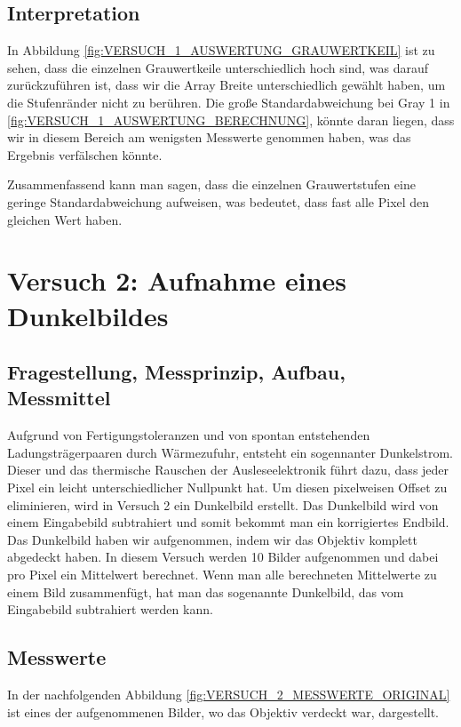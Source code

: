 \documentclass[12pt, oneside, a4paper, \docLanguage]{report}
\begin{document}
\section{Interpretation}
\label{chap:VERSUCH_1_INTERPRETATION}
In Abbildung \ref{fig:VERSUCH_1_AUSWERTUNG_GRAUWERTKEIL} ist zu sehen, dass die einzelnen Grauwertkeile unterschiedlich hoch sind, was darauf zurückzuführen ist, dass wir die Array Breite unterschiedlich gewählt haben, um die Stufenränder nicht zu berühren. Die große Standardabweichung bei Gray 1 in \ref{fig:VERSUCH_1_AUSWERTUNG_BERECHNUNG}, könnte daran liegen, dass wir in diesem Bereich am wenigsten Messwerte genommen haben, was das Ergebnis verfälschen könnte.

Zusammenfassend kann man sagen, dass die einzelnen Grauwertstufen eine geringe Standardabweichung aufweisen, was bedeutet, dass fast alle Pixel den gleichen Wert haben.


%
%
\chapter{Versuch 2: Aufnahme eines Dunkelbildes}
\label{chap:VERSUCH_2}

\section{Fragestellung, Messprinzip, Aufbau, Messmittel}
\label{chap:VERSUCH_2_FRAGESTELLUNG}
Aufgrund von Fertigungstoleranzen und von spontan entstehenden Ladungsträgerpaaren durch Wärmezufuhr, entsteht ein sogennanter Dunkelstrom. Dieser und das thermische Rauschen der Ausleseelektronik führt dazu, dass jeder Pixel ein leicht unterschiedlicher Nullpunkt hat. Um diesen pixelweisen Offset zu eliminieren, wird in Versuch 2 ein Dunkelbild erstellt. Das Dunkelbild wird von einem Eingabebild subtrahiert und somit bekommt man ein korrigiertes Endbild. Das Dunkelbild haben wir aufgenommen, indem wir das Objektiv komplett abgedeckt haben. In diesem Versuch werden 10 Bilder aufgenommen und dabei pro Pixel ein Mittelwert berechnet. Wenn man alle berechneten Mittelwerte zu einem Bild zusammenfügt, hat man das sogenannte Dunkelbild, das vom Eingabebild subtrahiert werden kann.
\newpage
\section{Messwerte}
\label{chap:VERSUCH_2_MESSWERTE}
In der nachfolgenden Abbildung \ref{fig:VERSUCH_2_MESSWERTE_ORIGINAL} ist eines der aufgenommenen Bilder, wo das Objektiv verdeckt war, dargestellt.
\end{document}

